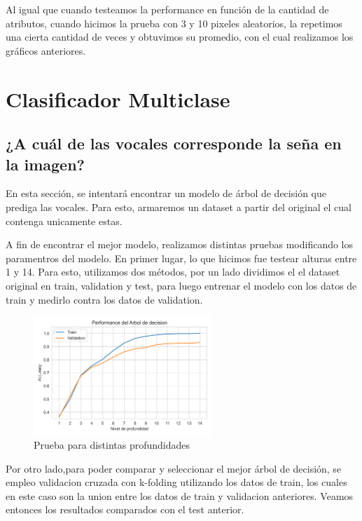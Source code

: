 \documentclass[10pt,a4paper]{article}
\begin{document}
Al igual que cuando testeamos la performance en función de la cantidad de atributos, cuando hicimos la prueba con 3 y 10 pixeles aleatorios, la repetimos una cierta cantidad de veces y obtuvimos su promedio, con el cual realizamos los gráficos anteriores.

\newpage

\section{Clasificador Multiclase}

\vspace{0.05cm}

\subsection{¿A cuál de las vocales corresponde la seña en la imagen?}

En esta sección, se intentará encontrar un modelo de árbol de decisión que prediga las vocales. Para esto, armaremos un dataset a partir del original el cual contenga unicamente estas. \vspace{0.05cm}

A fin de encontrar el mejor modelo, realizamos distintas pruebas modificando los paramentros del modelo. En primer lugar, lo que hicimos fue testear alturas
entre 1 y 14. Para esto, utilizamos dos métodos, por un lado dividimos el el dataset original en train, validation y test, para luego entrenar
el modelo con los datos de train y medirlo contra los datos de validation. 

\begin{figure}[h]
  \centering
  \includegraphics[width=0.6\textwidth]{Imagenes/primer_prueba_arbol.png}
  \caption{Prueba para distintas profundidades}
  \label{fig:Tabla 1}
\end{figure}

Por otro lado,para poder comparar y seleccionar el mejor árbol de decisión, se empleo validacion cruzada con k-folding utilizando los datos de train, los cuales
en este caso son la union entre los datos de train y validacion anteriores. Veamos entonces los resultados comparados con el test anterior.
\end{document}
